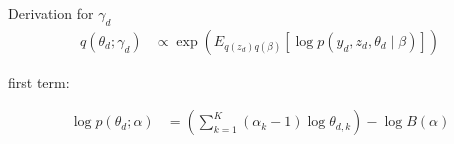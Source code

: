 \documentclass [12pt]{article}
\begin{document}
\begin{itemize}
Derivation for $\gamma_{d}$
\begin{align*}
    q(\theta_{d} ; \gamma_d) &\propto \exp 
    \left(
    E_{q(z_d) q(\beta)}
    \left[
    	\log p(y_{d}, z_{d}, \theta_d \mid \beta)
    \right]
    \right)
\end{align*}



first term:

\begin{align*}
   \log p(\theta_{d}; \alpha) &=  \left( \sum_{k=1}^K (\alpha_{k} -1 ) \log \theta_{d,k}\right) - \log B(\alpha)
\end{align*}


\end{itemize}
\end{document}
